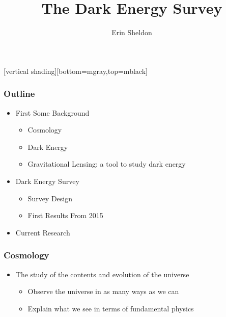 \documentclass{beamer}
\title{The Dark Energy Survey}
\author{Erin Sheldon}
\institute{Brookhaven National Laboratory}
\begin{document}
\frame{\titlepage}

\frame
{
}


[vertical shading][bottom=mgray,top=mblack]

\frame
{
    \frametitle{Outline}

 
    \begin{itemize}

        \item First Some Background
        
        \begin{itemize}
            \item Cosmology
            \item Dark Energy
            \item Gravitational Lensing: a tool to study dark energy
        \end{itemize}

        \item Dark Energy Survey

        \begin{itemize}
            \item{Survey Design}
            \item{First Results From 2015}
        \end{itemize}

        \item Current Research

    \end{itemize}

}

\frame
{
    \frametitle{Cosmology}

 
    \begin{itemize}

        \item The study of the contents and evolution of the universe
        
        \begin{itemize}
            \item Observe the universe in as many
                ways as we can
            \item Explain what we see in terms of fundamental physics
        \end{itemize}

    \end{itemize}

}
\end{document}
